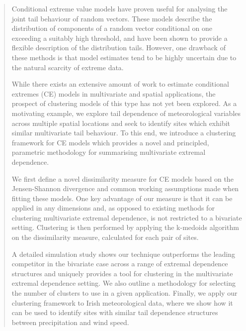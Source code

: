 \documentclass{article}
\numberwithin{equation}{section}
\begin{document}
\begin{abstract}
  Conditional extreme value models have proven useful for analysing the joint tail behaviour of random vectors. 
 These models describe the distribution of components of a random vector conditional on one exceeding a suitably high threshold, and have been shown to provide a flexible description of the distribution tails.
 However, one drawback of these methods is that model estimates tend to be highly uncertain due to the natural scarcity of extreme data. 
 
 While there exists an extensive amount of work to estimate conditional extremes (CE) models in multivariate and spatial applications, the prospect of clustering models of this type has not yet been explored. 
 As a motivating example, we explore tail dependence of meteorological variables across multiple spatial locations and seek to identify sites which exhibit similar multivariate tail behaviour. 
 To this end, we introduce a clustering framework for CE models which provides a novel and principled, parametric methodology for summarising multivariate extremal dependence.
 
 We first define a novel dissimilarity measure for CE models based on the Jensen-Shannon divergence and common working assumptions made when fitting these models. 
 One key advantage of our measure is that it can be applied in any dimensions and, as opposed to existing methods for clustering multivariate extremal dependence, is not restricted to a bivariate setting. 
Clustering is then performed by applying the k-medoids algorithm on the dissimilarity measure, calculated for each pair of sites.  
 
 A detailed simulation study shows our technique outperforms the leading competitor in the bivariate case across a range of extremal dependence structures and uniquely provides a tool for clustering in the multivariate extremal dependence setting. 
 We also outline a methodology for selecting the number of clusters to use in a given application.  Finally, we apply our clustering framework to Irish meteorological data, where we show how it can be used to identify sites with similar tail dependence structures between precipitation and wind speed.

\end{abstract}
\end{document}
